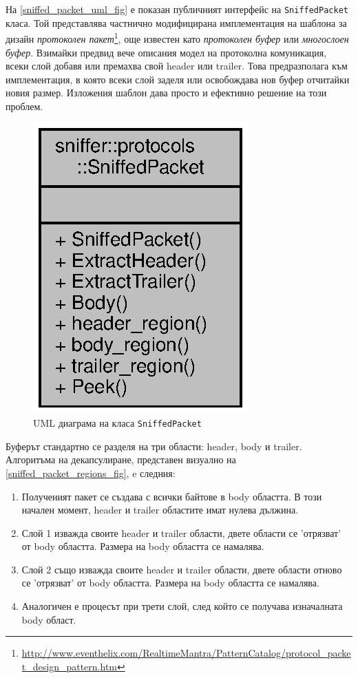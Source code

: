 \documentclass[12pt,a4paper,oneside]{book}
\begin{document}
На \autoref{sniffed_packet_uml_fig} е показан публичният интерфейс на
\texttt{SniffedPacket} класа. Той представлява частнично модифицирана
имплементация на шаблона за дизайн \textit{протоколен
пакет}\footnote{\url{http://www.eventhelix.com/RealtimeMantra/PatternCatalog/protocol_packet_design_pattern.htm}}, още известен като
\textit{протоколен буфер} или \textit{многослоен буфер}. Взимайки предвид
вече описания модел на протоколна комуникация,
всеки слой добавя или премахва свой header или trailer.
Това предразполага към имплементация, в която всеки слой заделя или освобождава
нов буфер отчитайки новия размер. Изложения шаблон дава просто и ефективно
решение на този проблем.

\begin{figure}[h!]
  \centering
  \includegraphics[scale=.7]{figures/sniffed_packet_uml.eps}
  \caption{UML диаграма на класа \texttt{SniffedPacket}}
  \label{sniffed_packet_uml_fig}
\end{figure}

Буферът стандартно се разделя на три области: header, body и trailer.
Алгоритъма на декапсулиране, представен визуално на
\autoref{sniffed_packet_regions_fig}, e следния:

\begin{enumerate}
  \item
    Полученият пакет се създава с всички байтове в body областта. В този начален
    момент, header и trailer областите имат нулева дължина.
\item
  Слой 1 изважда своите header и trailer области, двете области се 'отрязват' от
  body областта. Размера на body областта се намалява.
\item
  Слой 2 също изважда своите header и trailer области, двете области отново се
  'отрязват' от body областта. Размера на body областта се намалява.
\item
  Аналогичен е процесът при трети слой, след който се получава изначалната body
  област.
\end{enumerate}
\end{document}
